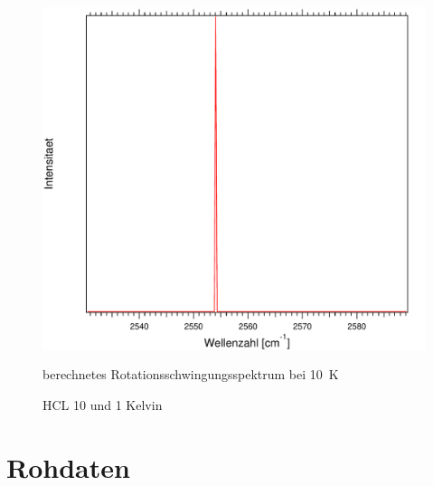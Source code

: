 \begin{figure}[H]
\centering	
	\begin{minipage}{0.47\linewidth}
	\includegraphics[width=\linewidth]{Bilder/001HCL.pdf}
	\caption{berechnetes Rotationsschwingungsspektrum bei 10~K}
	\end{minipage}

	\caption{HCL 10 und 1 Kelvin}
	
	
\end{figure}


\section{Rohdaten}

